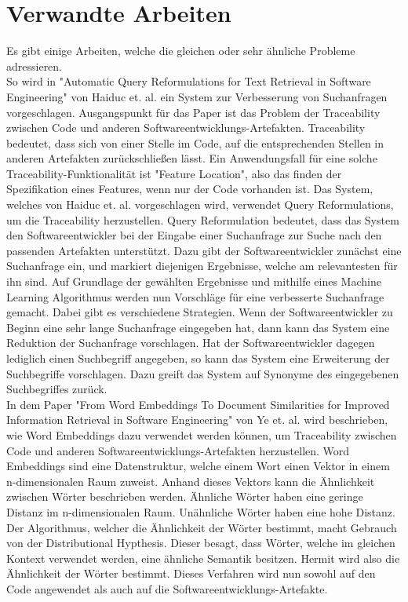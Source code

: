 \section{Verwandte Arbeiten}

Es gibt einige Arbeiten, welche die gleichen oder sehr ähnliche Probleme adressieren.\\

So wird in "Automatic Query Reformulations for Text Retrieval in Software Engineering" von Haiduc et. al. ein System zur Verbesserung von Suchanfragen vorgeschlagen.
Ausgangspunkt für das Paper ist das Problem der Traceability zwischen Code und anderen Softwareentwicklungs-Artefakten.
Traceability bedeutet, dass sich von einer Stelle im Code, auf die entsprechenden Stellen in anderen Artefakten zurückschließen lässt.
Ein Anwendungsfall für eine solche Traceability-Funktionalität ist "Feature Location", also das finden der Spezifikation eines Features, wenn nur der Code vorhanden ist.
Das System, welches von Haiduc et. al. vorgeschlagen wird, verwendet Query Reformulations, um die Traceability herzustellen.
Query Reformulation bedeutet, dass das System den Softwareentwickler bei der Eingabe einer Suchanfrage zur Suche nach den passenden Artefakten unterstützt.
Dazu gibt der Softwareentwickler zunächst eine Suchanfrage ein, und markiert diejenigen Ergebnisse, welche am relevantesten für ihn sind.
Auf Grundlage der gewählten Ergebnisse und mithilfe eines Machine Learning Algorithmus werden nun Vorschläge für eine verbesserte Suchanfrage gemacht.
Dabei gibt es verschiedene Strategien.
Wenn der Softwareentwickler zu Beginn eine sehr lange Suchanfrage eingegeben hat, dann kann das System eine Reduktion der Suchanfrage vorschlagen.
Hat der Softwareentwickler dagegen lediglich einen Suchbegriff angegeben, so kann das System eine Erweiterung der Suchbegriffe vorschlagen.
Dazu greift das System auf Synonyme des eingegebenen Suchbegriffes zurück.\\

In dem Paper "From Word Embeddings To Document Similarities for Improved Information Retrieval in Software Engineering" von Ye et. al. wird beschrieben, wie Word Embeddings dazu verwendet werden können, um Traceability zwischen Code und anderen Softwareentwicklungs-Artefakten herzustellen.
Word Embeddings sind eine Datenstruktur, welche einem Wort einen Vektor in einem n-dimensionalen Raum zuweist.
Anhand dieses Vektors kann die Ähnlichkeit zwischen Wörter beschrieben werden.
Ähnliche Wörter haben eine geringe Distanz im n-dimensionalen Raum.
Unähnliche Wörter haben eine hohe Distanz.
Der Algorithmus, welcher die Ähnlichkeit der Wörter bestimmt, macht Gebrauch von der Distributional Hypthesis.
Dieser besagt, dass Wörter, welche im gleichen Kontext verwendet werden, eine ähnliche Semantik besitzen.
Hermit wird also die Ähnlichkeit der Wörter bestimmt.
Dieses Verfahren wird nun sowohl auf den Code angewendet als auch auf die Softwareentwicklungs-Artefakte.\\

